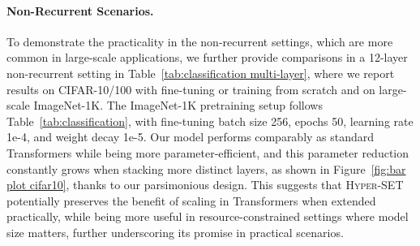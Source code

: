 
\paragraph{Non-Recurrent Scenarios.} 
To demonstrate the practicality in the non-recurrent settings, which are more common in large-scale applications, we further provide comparisons in a 12-layer non-recurrent setting in Table~\ref{tab:classification multi-layer}, where we report results on CIFAR-10/100 with fine-tuning or training from scratch and on large-scale ImageNet-1K. The ImageNet-1K pretraining setup follows Table~\ref{tab:classification}, with fine-tuning batch size 256, epochs 50, learning rate 1e-4, and weight decay 1e-5. Our model performs comparably as standard Transformers while being more parameter-efficient, and this parameter reduction constantly grows when stacking more distinct layers, as shown in Figure~\ref{fig:bar plot cifar10}, thanks to our parsimonious design. This suggests that \textsc{Hyper-SET} potentially preserves the benefit of scaling in Transformers when extended practically, while being more useful in resource-constrained settings where model size matters, further underscoring its promise in practical scenarios.


